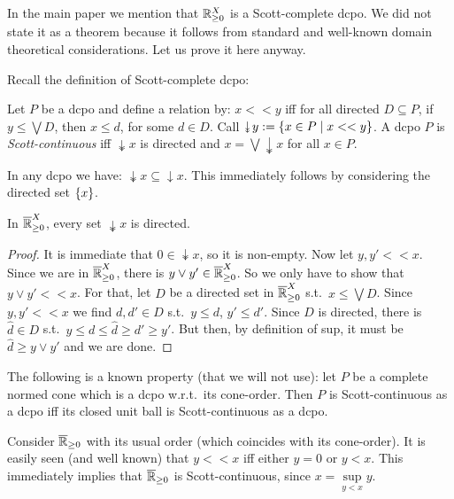 In the main paper we mention that $\mathbb{R}_{\geq0}^X$ is a Scott-complete dcpo.
We did not state it as a theorem because it follows from standard and well-known domain theoretical considerations.
Let us prove it here anyway.

Recall the definition of Scott-complete dcpo:

\begin{definition}
 Let $P$ be a dcpo and define a relation by: $x<<y$ iff for all directed $D\subseteq P$, if $y\leq \bigvee D$, then $x\leq d$, for some $d\in D$.
 Call $\twoheaddownarrow y:=\set{x\in P\mid x<<y}$.
 A dcpo $P$ is \emph{Scott-continuous} iff $\twoheaddownarrow x$ is directed and $x=\bigvee\twoheaddownarrow x$ for all $x\in P$.
\end{definition}

\begin{remark}
 In any dcpo we have: $\twoheaddownarrow x \subseteq \downarrow x$.
 This immediately follows by considering the directed set $\{x\}$.
\end{remark}

\begin{lemma}\label{lm:<<dir}
 In $\overline{\mathbb{R}}_{\geq 0}^X$, every set $\twoheaddownarrow x$ is directed.
\end{lemma}
\begin{proof}
 It is immediate that $0\in\twoheaddownarrow x$, so it is non-empty.
 Now let $y,y' << x$.
 Since we are in $\overline{\mathbb{R}}_{\geq 0}^X$, there is $y\vee y'\in\overline{\mathbb{R}}_{\geq 0}^X$.
 So we only have to show that $y\vee y'<<x$.
 For that, let $D$ be a directed set in $\overline{\mathbb{R}}_{\geq 0}^X$ s.t.\ $x\leq\bigvee D$.
 Since $y,y' << x$ we find $d,d'\in D$ s.t.\ $y\leq d$, $y'\leq d'$.
 Since $D$ is directed, there is $\hat d\in D$ s.t.\ $y\leq d\leq \hat d\geq d'\geq y'$.
 But then, by definition of sup, it must be $\hat d\geq y\vee y'$ and we are done.
\end{proof}

\begin{remark}
 The following is a known property (that we will not use):
 let $P$ be a complete normed cone which is a dcpo w.r.t.\ its cone-order. Then $P$ is Scott-continuous as a dcpo iff its closed unit ball is Scott-continuous as a dcpo.
\end{remark}

\begin{remark}\label{rmk:<<R}
 Consider $\overline{\mathbb{R}}_{\geq 0}$ with its usual order (which coincides with its cone-order).
 It is easily seen (and well known) that $y<<x$ iff either $y=0$ or $y<x$.
 This immediately implies that $\overline{\mathbb{R}}_{\geq 0}$ is Scott-continuous, since $x=\sup\limits_{y<x} y$.
\end{remark}

